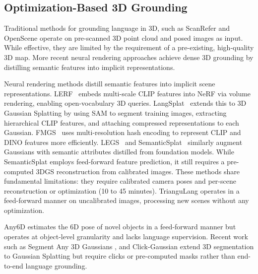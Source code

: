 
\subsection{Optimization-Based 3D Grounding}
Traditional methods for grounding language in 3D, such as ScanRefer \cite{scanrefer} and OpenScene \cite{openscene3d} operate on pre-scanned 3D point cloud and posed images as input. While effective, they are limited by the requirement of a pre-existing, high-quality 3D map. More recent neural rendering approaches achieve dense 3D grounding by distilling semantic features into implicit representations.

Neural rendering methods distill semantic features into implicit scene representations. LERF~\cite{lerf} embeds multi-scale CLIP features into NeRF via volume rendering, enabling open-vocabulary 3D queries. LangSplat~\cite{langsplat} extends this to 3D Gaussian Splatting by using SAM to segment training images, extracting hierarchical CLIP features, and attaching compressed representations to each Gaussian. FMGS~\cite{fmgs} uses multi-resolution hash encoding to represent CLIP and DINO features more efficiently. LEGS~\cite{yu2024legs} and SemanticSplat~\cite{semanticsplat} similarly augment Gaussians with semantic attributes distilled from foundation models. While SemanticSplat employs feed-forward feature prediction, it still requires a pre-computed 3DGS reconstruction from calibrated images. These methods share fundamental limitations: they require calibrated camera poses and per-scene reconstruction or optimization (10 to 45 minutes). TrianguLang operates in a feed-forward manner on uncalibrated images, processing new scenes without any optimization.

Any6D \cite{any6d} estimates the 6D pose of novel objects in a feed-forward manner but operates at object-level granularity and lacks language supervision. Recent work such as Segment Any 3D Gaussians \cite{SAGA}, and Click-Gaussian \cite{clickgauss} extend 3D segmentation to Gaussian Splatting but require clicks or pre-computed masks rather than end-to-end language grounding.


